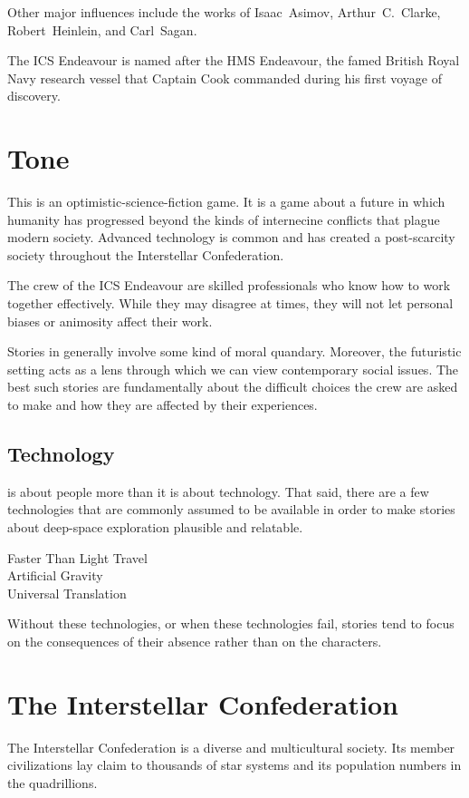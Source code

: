 \documentclass[11pt, a5paper, parskip=half-, DIV=12]{scrartcl}
\begin{document}
Other major influences include the works of Isaac~Asimov, Arthur~C.~Clarke, Robert~Heinlein, and Carl~Sagan.
 
The ICS Endeavour is named after the HMS Endeavour, the famed British Royal Navy research vessel that Captain Cook commanded during his first voyage of discovery.

\newpage

\section*{Tone}
This is an optimistic-science-fiction game. It is a game about a future in which humanity has progressed beyond the kinds of internecine conflicts that plague modern society. Advanced technology is common and has created a post-scarcity society throughout the Interstellar Confederation.

The crew of the ICS Endeavour are skilled professionals who know how to work together effectively. While they may disagree at times, they will not let personal biases or animosity affect their work.

Stories in \ENDEAVOUR{} generally involve some kind of moral quandary. Moreover, the futuristic setting acts as a lens through which we can view contemporary social issues. The best such stories are fundamentally about the difficult choices the crew are asked to make and how they are affected by their experiences.  

\subsection*{Technology}
\ENDEAVOUR{} is about people more than it is about technology. That said, there are a few technologies that are commonly assumed to be available in order to make stories about deep-space exploration plausible and relatable.
\begin{description}
	\item[Faster Than Light Travel]
	\item[Artificial Gravity]
	\item[Universal Translation]
\end{description}
Without these technologies, or when these technologies fail, stories tend to focus on the consequences of their absence rather than on the characters.

\newpage

\section*{The Interstellar Confederation}
The Interstellar Confederation is a diverse and multicultural society. Its member civilizations lay claim to thousands of star systems and its population numbers in the quadrillions. 
\end{document}
